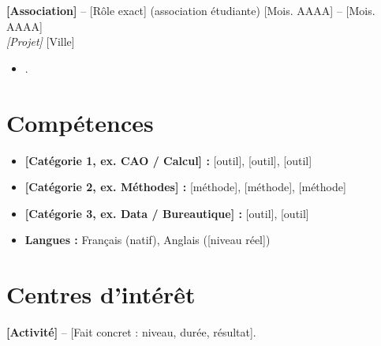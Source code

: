 \documentclass[11pt,a4paper]{article}
\begin{document}
\vspace{4pt}

\noindent
\textbf{[Association]} -- [Rôle exact] (association étudiante) \hfill [Mois. AAAA] -- [Mois. AAAA] \\
\textit{[Projet]} \hfill [Ville]
\begin{itemize}
    \item [Action concrète avec un mot-clé de l'offre].
\end{itemize}

\section{Compétences}

\begin{itemize}[label={},leftmargin=0in,itemsep=5pt]
    \item \textbf{[Catégorie 1, ex. CAO / Calcul] :} [outil], [outil], [outil]
    \item \textbf{[Catégorie 2, ex. Méthodes] :} [méthode], [méthode], [méthode]
    \item \textbf{[Catégorie 3, ex. Data / Bureautique] :} [outil], [outil]
    \item \textbf{Langues :} Français (natif), Anglais ([niveau réel])
\end{itemize}

\section{Centres d'intérêt}

\noindent
\textbf{[Activité]} -- [Fait concret : niveau, durée, résultat].
\end{document}
